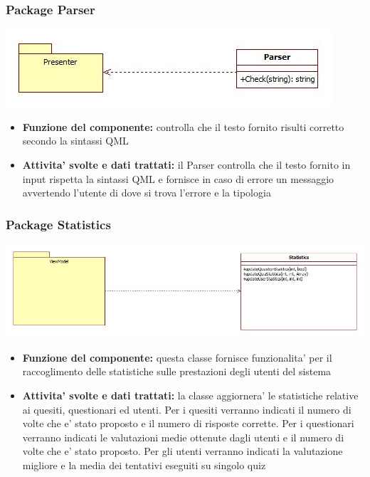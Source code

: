			\subsubsection{Package Parser}
			\begin{center}
				\includegraphics[scale=0.6]{../images/Parser.jpg}
			\end{center}
 			\begin{itemize}
		    	\item\textbf{Funzione del componente:} controlla che il testo fornito risulti corretto secondo la sintassi QML
			\item\textbf{Attivita' svolte e dati trattati:} il Parser controlla che il testo fornito in input rispetta la sintassi QML e fornisce in caso di errore un messaggio avvertendo l'utente di dove si trova l'errore e la tipologia
			\end{itemize}
			
			\subsubsection{Package Statistics}
			\begin{center}
				\includegraphics[scale=0.4]{../images/Statistics.jpg}
			\end{center}
 			\begin{itemize}
		    	\item\textbf{Funzione del componente:} questa classe fornisce funzionalita' per il raccoglimento delle statistiche sulle prestazioni degli utenti del sistema
			\item\textbf{Attivita' svolte e dati trattati:} la classe aggiornera' le statistiche relative ai quesiti, questionari ed utenti.
			Per i quesiti verranno indicati il numero di volte che e' stato proposto e il numero di risposte corrette.
			Per i questionari verranno indicati le valutazioni medie ottenute dagli utenti e il numero di volte che e' stato proposto.
			Per gli utenti verranno indicati la valutazione migliore e la media dei tentativi eseguiti su singolo quiz
			\end{itemize}
			

